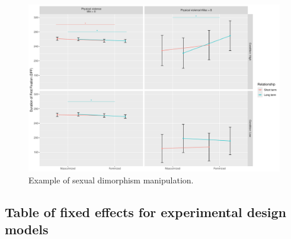 \documentclass[
  bookmarksnumbered]{article}
\begin{document}
\begin{figure}
\centering
\includegraphics{Supplementary_material_files/figure-latex/unnamed-chunk-48-1.pdf}
\caption{\label{fig:unnamed-chunk-48}Example of sexual dimorphism manipulation.}
\end{figure}

\subsection{Table of fixed effects for experimental design models}\label{table-of-fixed-effects-for-experimental-design-models}
\end{document}

